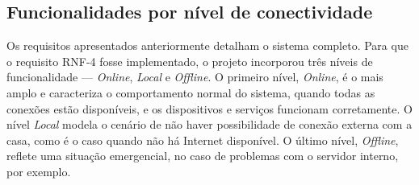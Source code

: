 \subsection{Funcionalidades por nível de conectividade}

Os requisitos apresentados anteriormente detalham o sistema completo. Para que o requisito RNF-4 fosse implementado, o projeto incorporou três níveis de funcionalidade --- \emph{Online}, \emph{Local} e \emph{Offline}. O primeiro nível, \emph{Online}, é o mais amplo e caracteriza o comportamento normal do sistema, quando todas as conexões estão disponíveis, e os dispositivos e serviços funcionam corretamente. O nível \emph{Local} modela o cenário de não haver possibilidade de conexão externa com a casa, como é o caso quando não há Internet disponível. O último nível, \emph{Offline}, reflete uma situação emergencial, no caso de problemas com o servidor interno, por exemplo.
